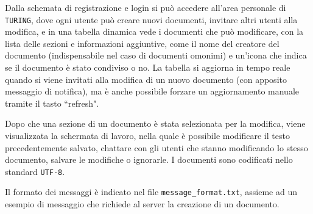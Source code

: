 \medskip

Dalla schemata di registrazione e login si può accedere all'area personale di \texttt{TURING}, dove ogni utente può creare nuovi documenti, invitare altri utenti alla modifica, e in una tabella dinamica vede i documenti che può modificare, con la lista delle sezioni e informazioni aggiuntive, come il nome del creatore del documento (indispensabile nel caso di documenti omonimi) e un'icona che indica se il documento è stato condiviso o no. La tabella si aggiorna in tempo reale quando si viene invitati alla modifica di un nuovo documento (con apposito messaggio di notifica), ma è anche possibile forzare un aggiornamento manuale tramite il tasto ``refresh".

\medskip

Dopo che una sezione di un documento è stata selezionata per la modifica, viene visualizzata la schermata di lavoro, nella quale è possibile modificare il testo precedentemente salvato, chattare con gli utenti che stanno modificando lo stesso documento, salvare le modifiche o ignorarle. I documenti sono codificati nello standard \texttt{UTF-8}.

\medskip

Il formato dei messaggi è indicato nel file \texttt{message\_format.txt}, assieme ad un esempio di messaggio che richiede al server la creazione di un documento.
